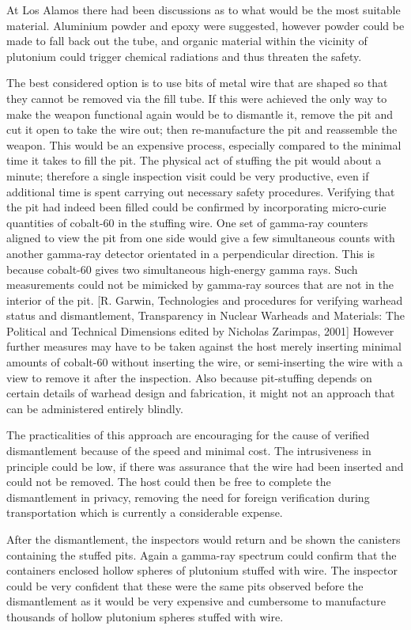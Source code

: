 \documentclass[twoside,titlepage,11pt,twocolumn,a4paper]{article}
\begin{document}
At Los Alamos there had been discussions as to what would be the most
suitable material. Aluminium powder and epoxy were suggested, however
powder could be made to fall back out the tube, and organic material
within the vicinity of plutonium could trigger chemical radiations and
thus threaten the safety.

The best considered option is to use bits of metal wire that are
shaped so that they cannot be removed via the fill tube.  If this were
achieved the only way to make the weapon functional again would be to
dismantle it, remove the pit and cut it open to take the wire out;
then re-manufacture the pit and reassemble the weapon. This would be an
expensive process, especially compared to the minimal time it takes to
fill the pit.  The physical act of stuffing the pit would about a
minute; therefore a single inspection visit could be very productive,
even if additional time is spent carrying out necessary safety
procedures.  Verifying that the pit had indeed been filled could be
confirmed by incorporating micro-curie quantities of cobalt-60 in the
stuffing wire. One set of gamma-ray counters aligned to view the pit
from one side would give a few simultaneous counts with another
gamma-ray detector orientated in a perpendicular direction.  This is
because cobalt-60 gives two simultaneous high-energy gamma rays. Such
measurements could not be mimicked by gamma-ray sources that are not
in the interior of the pit.  [R. Garwin, Technologies and procedures
  for verifying warhead status and dismantlement, Transparency in
  Nuclear Warheads and Materials: The Political and Technical
  Dimensions edited by Nicholas Zarimpas, 2001] However further
measures may have to be taken against the host merely inserting
minimal amounts of cobalt-60 without inserting the wire, or
semi-inserting the wire with a view to remove it after the
inspection. Also because pit-stuffing depends on certain details of
warhead design and fabrication, it might not an approach that can be
administered entirely blindly.

The practicalities of this approach are encouraging for the cause of
verified dismantlement because of the speed and minimal cost. The
intrusiveness in principle could be low, if there was assurance that
the wire had been inserted and could not be removed. The host could
then be free to complete the dismantlement in privacy, removing the
need for foreign verification during transportation which is currently
a considerable expense.

After the dismantlement, the inspectors would return and be shown the
canisters containing the stuffed pits. Again a gamma-ray spectrum
could confirm that the containers enclosed hollow spheres of plutonium
stuffed with wire. The inspector could be very confident that these
were the same pits observed before the dismantlement as it would be
very expensive and cumbersome to manufacture thousands of hollow
plutonium spheres stuffed with wire.
\end{document}
